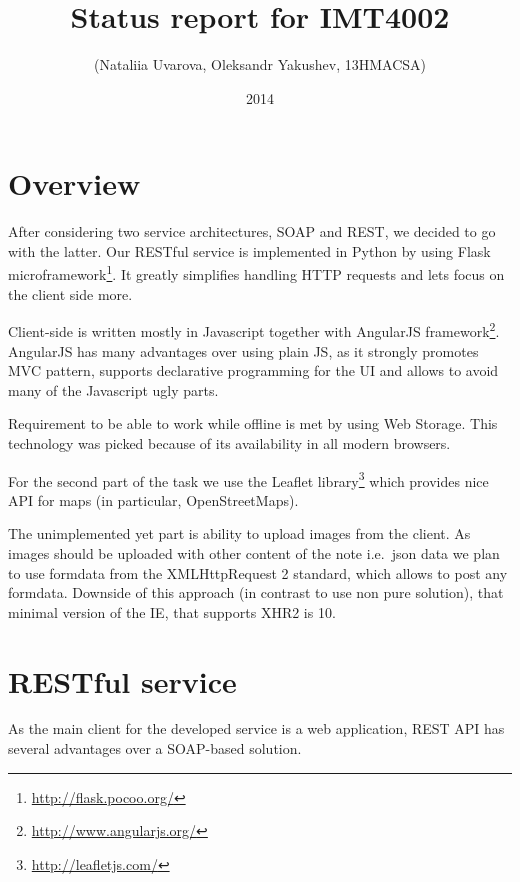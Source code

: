 \documentclass[12pt,a4paper]{article}
\begin{document}
\lstset{
numbers=left,
tabsize=4,
breaklines=true,
title=\lstname,
}
\title{Status report for IMT4002}
\author{(Nataliia Uvarova, Oleksandr Yakushev, 13HMACSA)}
\date{2014}
\maketitle
\onehalfspacing

\section{Overview}

After considering two service architectures, SOAP and REST, we decided
to go with the latter. Our RESTful service is implemented in Python by
using Flask microframework\footnote{\url{http://flask.pocoo.org/}}.
It greatly simplifies handling HTTP requests and lets focus on the
client side more.

Client-side is written mostly in Javascript together with AngularJS
framework\footnote{\url{http://www.angularjs.org/}}. AngularJS has
many advantages over using plain JS, as it strongly promotes MVC
pattern, supports declarative programming for the UI and allows to
avoid many of the Javascript ugly parts.

Requirement to be able to work while offline is met by using Web Storage.
This technology was picked because of its availability in all modern browsers.

For the second part of the task we use the Leaflet
library\footnote{\url{http://leafletjs.com/}} which provides nice API
for maps (in particular, OpenStreetMaps).

The unimplemented yet part is ability to upload images from the client. As images should be
uploaded with other content of the note i.e.\  json data we plan to use formdata from
the XMLHttpRequest 2 standard, which allows to post any formdata. Downside of this approach (in contrast to use
non pure solution), that minimal version of the IE, that supports XHR2 is 10.

\section{RESTful service}

As the main client for the developed service is a web application,
REST API has several advantages over a SOAP-based solution.
\end{document}
